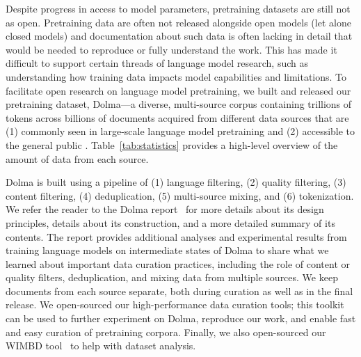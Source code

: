 \documentclass[11pt]{article}
\newcommand{\dolma}{Dolma\xspace}
\begin{document}
Despite progress in access to model parameters, pretraining datasets are still not as open. 
Pretraining data are often not released alongside open models (let alone closed models) and documentation about such data is often lacking in detail that would be needed to reproduce or fully understand the work. 
This has made it difficult to support certain threads of language model research, such as understanding how training data impacts model capabilities and limitations.
To facilitate open research on language model pretraining, we built and released our pretraining dataset, \dolma---a diverse, multi-source corpus containing trillions of tokens across billions of documents acquired from different data sources that are (1) commonly seen in large-scale language model pretraining and (2) accessible to the general public \citep{dolma}. 
Table~\ref{tab:statistics} provides a high-level overview of the amount of data from each source.

\dolma is built using a pipeline of 
(1) language filtering,
(2) quality filtering,
(3) content filtering,
(4) deduplication,
(5) multi-source mixing, and 
(6) tokenization.
We refer the reader to the \dolma report~\citep{dolma} for more details about its design principles, details about its construction, and a more detailed summary of its contents.
The report provides additional analyses and experimental results from training language models on intermediate states of \dolma to share what we learned about important data curation practices, including the role of content or quality filters, deduplication, and mixing data from multiple sources.
We keep documents from each source separate, both during curation as well as in the final release.
We open-sourced our high-performance data curation tools;
this toolkit can be used to further experiment on Dolma, reproduce our work, and enable fast and easy curation of pretraining corpora.
Finally, we also open-sourced our WIMBD tool~\citep{wimbd} to help with dataset analysis. 
\end{document}
